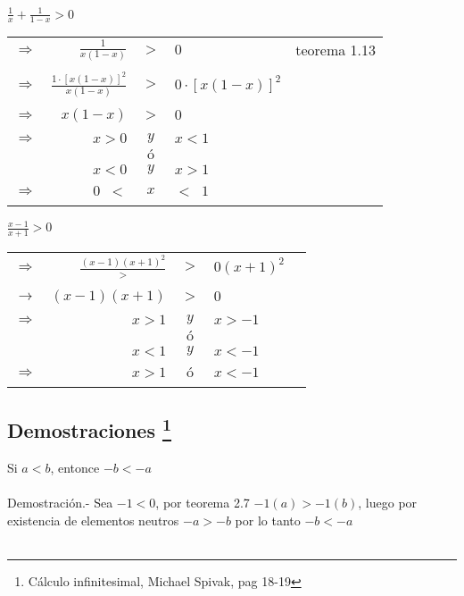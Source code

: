 \begin{ej}
$\displaystyle\frac{1}{x} + \frac{1}{1-x}>0$
\begin{center}
\begin{tabular}{crcll}
$\Rightarrow$&$\displaystyle\frac{1}{x(1-x)}$&$>$&$0$&teorema 1.13\\\\
$\Rightarrow$&$\displaystyle\frac{1\cdot \left[ x(1-x)\right]^2}{x(1-x)}$&$>$&$0\cdot \left[ x(1-x)\right] ^2$&\\\\
$\Rightarrow$&$x(1-x)$&$>$&$0$&\\\\
$\Rightarrow$&$x>0$&$y$&$x<1$&\\
&&$ó$&&\\
&$x<0$&$y$&$x>1$&\\\\
$\Rightarrow$&$0\; \; <$&$x$&$<\; \; 1$&\\\\
\end{tabular}
\end{center}
\end{ej}

\begin{ej}
$\displaystyle\frac{x-1}{x+1}>0$
\begin{center}
\begin{tabular}{crcll}
$\Rightarrow$&$\displaystyle\frac{(x-1)(x+1)^2}{>}$&$>$&$0(x+1)^2$&\\\\
$\rightarrow$&$(x-1)(x+1)$&$>$&$0$&\\\\
$\Rightarrow$&$x>1$&$y$&$x>-1$&\\
&&$ó$&&\\
&$x<1$&$y$&$x<-1$&\\\\
$\Rightarrow$&$x>1$&$ó$&$x<-1$&\\\\
\end{tabular}
\end{center}
\end{ej}

 

\subsection[Demostraciones]{Demostraciones \footnote{Cálculo infinitesimal, Michael Spivak, pag 18-19}} 
\begin{teo}
Si $a<b$, entonce $-b<-a$\\\\
Demostración.- \;
Sea $-1<0$, por teorema 2.7 \; $-1(a)>-1(b)$, luego por existencia de elementos neutros $-a>-b$ por lo tanto $-b<-a$\\\\
\end{teo}

